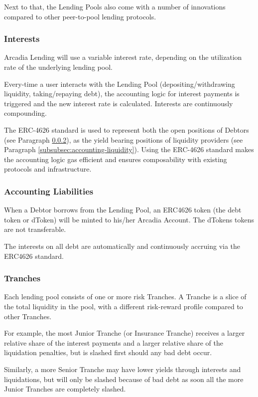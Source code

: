 \documentclass[sigconf,nonacm]{acmart}
\begin{document}
Next to that, the Lending Pools also come with a number of innovations compared to other peer-to-pool lending protocols.

\subsubsection{Interests}
Arcadia Lending will use a variable interest rate, depending on the utilization rate of the underlying lending pool.

Every-time a user interacts with the Lending Pool (depositing/withdrawing liquidity, taking/repaying debt),
the accounting logic for interest payments is triggered and the new interest rate is calculated.
Interests are continuously compounding.

The ERC-4626 standard is used to represent both the open positions of Debtors (see Paragraph \ref{subsubsec:accounting-liabilities}),
as the yield bearing positions of liquidity providers (see Paragraph \ref{subsubsec:accounting-liquidity}).
Using the ERC-4626 standard makes the accounting logic gas efficient and ensures composability with existing protocols and infrastructure.

\subsubsection{Accounting Liabilities}
\label{subsubsec:accounting-liabilities}
When a Debtor borrows from the Lending Pool,
an ERC4626 token (the debt token or dToken) will be minted to his/her Arcadia Account.
The dTokens tokens are not transferable.

The interests on all debt are automatically and continuously accruing via the ERC4626 standard.

\subsubsection{Tranches}
Each lending pool consists of one or more risk Tranches.
A Tranche is a slice of the total liquidity in the pool, with a different risk-reward profile compared to other Tranches.

For example, the most Junior Tranche (or Insurance Tranche) receives a larger relative share of the interest payments and a larger relative share of the liquidation penalties,
but is slashed first should any bad debt occur.

Similarly, a more Senior Tranche may have lower yields through interests and liquidations,
but will only be slashed because of bad debt as soon all the more Junior Tranches are completely slashed.
\end{document}
